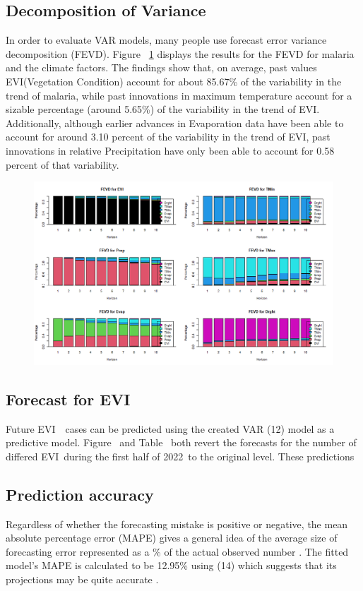 \subsection{ Decomposition of Variance}
In order to evaluate VAR models, many people use forecast error variance decomposition (FEVD). Figure ~\ref{fig:fevd} displays the results for the FEVD for malaria and the climate factors. The findings show that, on average, past values EVI(Vegetation Condition)  account for about 85.67\% of the variability in the trend of malaria, while past innovations in maximum temperature account for a sizable percentage (around 5.65\%) of the variability in the trend of EVI. Additionally, although earlier advances in Evaporation data have been able to account for around 3.10 percent of the variability in the trend of EVI, past innovations in relative Precipitation have only been able to account for 0.58 percent of that variability.
\begin{figure}
	\centering
	\includegraphics[width=0.9\linewidth]{images/fevd}
	\caption{}
	\label{fig:fevd}
\end{figure}
\subsection{Forecast for EVI} Future EVI  cases can be predicted using the created VAR (12) model as a predictive model. Figure  and Table  both revert the forecasts for the number of differed EVI during the first half of 2022 to the original level. These predictions

\subsection{Prediction accuracy} Regardless of whether the forecasting mistake is positive or negative, the mean absolute percentage error (MAPE) gives a general idea of the average size of forecasting error represented as a \% of the actual observed number . The fitted model's MAPE is calculated to be 12.95\% using (14) which suggests that its projections may be quite accurate .

